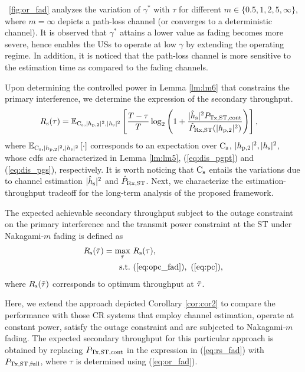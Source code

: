 \begin{remark} \label{rm:rm2}
\normalfont
\figurename~\ref{fig:or_fad} analyzes the variation of $\gamma^*$ with $\tau$ for different $m \in \{0.5, 1, 2, 5, \infty\}$, where $m = \infty$ depicts a path-loss channel (or converges to a deterministic channel). It is observed that $\gamma^*$ attains a lower value as fading becomes more severe, hence enables the USs to operate at low $\gamma$ by extending the operating regime. In addition, it is noticed that the path-loss channel is more sensitive to the estimation time as compared to the fading channels.  
\end{remark}

Upon determining the controlled power in Lemma \ref{lm:lm6} that constrains the primary interference, we determine the expression of the secondary throughput.
\begin{align}
R_{\text{s}}(\tau) &= {\mathbb E}_{\text{C}_{\text{s}}, |h_{\text{p,2}}|^2, |h_{\text{s}}|^2}\left[ \frac{T - \tau}{T} \log_2 \left(1 + \frac{|\hat{h}_{\text{s}}|^2 P_{\text{Tx,ST,cont}} }{\hat{P}_{\text{Rx,ST}}(|h_{\text{p,2}}|^2)} \right) \right], \label{eq:rs_fad} 
\end{align} 
where ${\mathbb E}_{\text{C}_{\text{s}}, |h_{\text{p,2}}|^2, |h_{\text{s}}|^2}\left[ \cdot \right]$ corresponds to an expectation over $\text{C}_{\text{s}}$, $|h_{\text{p,2}}|^2, |h_{\text{s}}|^2$, whose cdfs are characterized in Lemma \ref{lm:lm5}, (\ref{eq:dis_pgpt}) and (\ref{eq:dis_pgs}), respectively. It is worth noticing that $\text{C}_{\text{s}}$ entails the variations due to channel estimation $|\hat{h}_{\text{s}}|^2$ and $\hat{P}_{\text{Rx,ST}}$.
Next, we characterize the estimation-throughput tradeoff for the long-term analysis of the proposed framework. 
\begin{theorem} \label{th:th2}
\normalfont
The expected achievable secondary throughput subject to the outage constraint on the primary interference and the transmit power constraint at the ST under Nakagami-$m$ fading is defined as
\begin{align}
R_{\text{s}}(\tilde{\tau}) = \operatorname*{max}_{\tau}  & \text{      } {R_{\text{s}}(\tau)}, 
 \label{eq:sys_fad} \\
\text{s.t.} & \text{ } (\ref{eq:opc_fad}), \text{  } (\ref{eq:pc}), \nonumber 
 \end{align}
where $R_{\text{s}}(\tilde{\tau})$ corresponds to optimum throughput at $\tilde{\tau}$.  
\end{theorem}

\begin{coro} \label{cor:cor3}
\normalfont
Here, we extend the approach depicted Corollary \ref{cor:cor2} to compare the performance with those CR systems that employ channel estimation, operate at constant power, satisfy the outage constraint and are subjected to Nakagami-$m$ fading. The expected secondary throughput for this particular approach is obtained by replacing $P_{\text{Tx,ST,cont}}$ in the expression in (\ref{eq:rs_fad}) with $P_{\text{Tx,ST,full}}$, where $\tau$ is determined using (\ref{eq:or_fad}). 

\end{coro}
 
